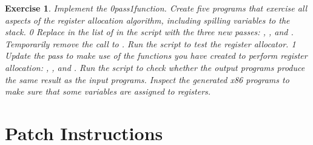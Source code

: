 \documentclass[7x10]{TimesAPriori_MIT}%
\def\racketEd{0}
\def\pythonEd{1}
\def\edition{1}
\newcommand{\racket}[1]{{\if\edition\racketEd{#1}\fi}}
\newcommand{\pythonColor}[0]{}
\newcommand{\python}[1]{{\if\edition\pythonEd\pythonColor #1\fi}}
\newtheorem{exercise}[theorem]{Exercise}
\numberwithin{theorem}{chapter}
\numberwithin{definition}{chapter}
\numberwithin{equation}{chapter}
\begin{document}
\begin{exercise}\normalfont\normalsize
Implement the  \racket{pass}\python{function}.
Create five programs that exercise all aspects of the register
allocation algorithm, including spilling variables to the stack.
%
{\if\edition\racketEd      
Replace  in the list of  in the
 script with the three new passes:
, , and
.
Temporarily remove the call to .
Run the script to test the register allocator.
\fi}
%
{\if\edition\pythonEd\pythonColor      
  Update the  pass to make use of
  the functions you have created to perform register allocation:
  , , and
  .
  Run the  script to check whether the
  output programs produce the same result as the input programs.
  Inspect the generated x86 programs to make sure that some variables
  are assigned to registers.
\fi}
\end{exercise}


\section{Patch Instructions}
\label{sec:patch-instructions}
\end{document}
